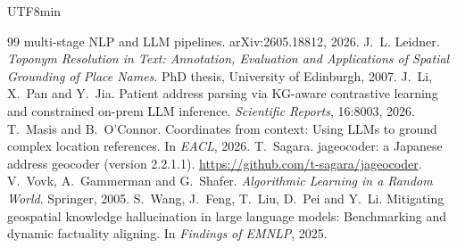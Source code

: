\documentclass[10pt]{article}
\begin{document}
\begin{CJK}{UTF8}{min}
\begin{thebibliography}{99}
multi-stage NLP and LLM pipelines. arXiv:2605.18812, 2026.
 J.~L. Leidner. \emph{Toponym Resolution in Text: Annotation, Evaluation and Applications
of Spatial Grounding of Place Names}. PhD thesis, University of Edinburgh, 2007.
 J.~Li, X.~Pan and Y.~Jia. Patient address parsing via KG-aware contrastive learning and
constrained on-prem LLM inference. \emph{Scientific Reports}, 16:8003, 2026.
 T.~Masis and B.~O'Connor. Coordinates from context: Using LLMs to ground complex
location references. In \emph{EACL}, 2026.
 T.~Sagara. jageocoder: a Japanese address geocoder (version 2.2.1.1).
\url{https://github.com/t-sagara/jageocoder}.
 V.~Vovk, A.~Gammerman and G.~Shafer. \emph{Algorithmic Learning in a Random World}.
Springer, 2005.
 S.~Wang, J.~Feng, T.~Liu, D.~Pei and Y.~Li. Mitigating geospatial knowledge
hallucination in large language models: Benchmarking and dynamic factuality aligning. In
\emph{Findings of EMNLP}, 2025.
\end{thebibliography}

\end{CJK}
\end{document}
